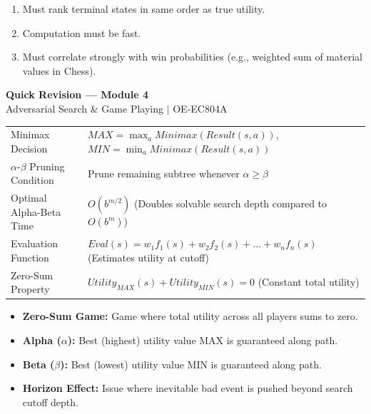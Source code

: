\documentclass[12pt,a4paper]{article}
\renewcommand{\arraystretch}{1.45}
\begin{document}
\begin{tcolorbox}[examplebox, title={Requirements for Evaluation Functions}]
  \begin{enumerate}[leftmargin=*, noitemsep]
    \item Must rank terminal states in same order as true utility.
    \item Computation must be fast.
    \item Must correlate strongly with win probabilities (e.g., weighted sum of material values in Chess).
  \end{enumerate}
\end{tcolorbox}

\newpage
\begin{center}
  {\large\bfseries\color{myred} Quick Revision --- Module 4}\\[3pt]
  {\small\color{mydark} Adversarial Search \& Game Playing $|$ OE-EC804A}
\end{center}
\noindent{\color{myred}\rule{\linewidth}{1.2pt}}
\vspace{4pt}

\begin{tcolorbox}[formulabox, title={\textbf{Key Concepts and Metrics at a Glance}}]
\renewcommand{\arraystretch}{1.35}
\begin{tabularx}{\linewidth}{B{4.5cm} X}
Minimax Decision & $MAX = \max_{a} Minimax(Result(s,a))$, $MIN = \min_{a} Minimax(Result(s,a))$ \\[4pt]
$\alpha$-$\beta$ Pruning Condition & Prune remaining subtree whenever $\alpha \ge \beta$ \\[4pt]
Optimal Alpha-Beta Time & $O(b^{m/2})$ \quad (Doubles solvable search depth compared to $O(b^m)$) \\[4pt]
Evaluation Function & $Eval(s) = w_1 f_1(s) + w_2 f_2(s) + \dots + w_n f_n(s)$ \quad (Estimates utility at cutoff) \\[4pt]
Zero-Sum Property & $Utility_{MAX}(s) + Utility_{MIN}(s) = 0$ \quad (Constant total utility) \\
\end{tabularx}
\end{tcolorbox}

\begin{tcolorbox}[defbox, title={\textbf{One-Line Definitions}}]
  \begin{itemize}[leftmargin=*, noitemsep]
    \item \textbf{Zero-Sum Game:} Game where total utility across all players sums to zero.
    \item \textbf{Alpha ($\alpha$):} Best (highest) utility value MAX is guaranteed along path.
    \item \textbf{Beta ($\beta$):} Best (lowest) utility value MIN is guaranteed along path.
    \item \textbf{Horizon Effect:} Issue where inevitable bad event is pushed beyond search cutoff depth.
  \end{itemize}
\end{tcolorbox}
\end{document}
